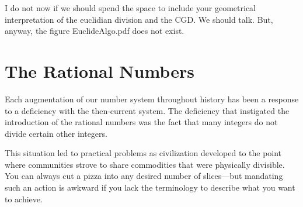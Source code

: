 {\Arny I do not now if we should spend the space to include your
  geometrical interpretation of the euclidian division and the CGD.
  We should talk.  But, anyway, the figure EuclideAlgo.pdf does not exist.}



\section{The Rational Numbers}
\label{sec:rationals}

Each augmentation of our number system throughout history has been a
response to a deficiency with the then-current system.  The deficiency
that instigated the introduction of the rational numbers was the fact
that many integers do not divide certain other integers.

This situation led to practical problems as civilization developed to
the point where communities strove to share commodities that were
physically divisible.  You can always cut a pizza into any desired
number of slices---but mandating such an action is awkward if you lack
the terminology to describe what you want to achieve.

